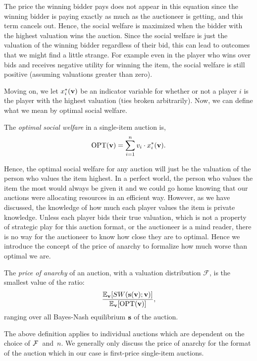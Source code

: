 \documentclass[12pt,twoside]{reedthesis}
\begin{document}
The price the winning bidder pays does not appear in this equation since the winning bidder is paying exactly as much as the auctioneer is getting, and this term cancels out. Hence, the social welfare is maximized when the bidder with the highest valuation wins the auction. Since the social welfare is just the valuation of the winning bidder regardless of their bid, this can lead to outcomes that we might find a little strange. For example even in the player who wins over bids and receives negative utility for winning the item, the social welfare is still positive (assuming valuations greater than zero). 

Moving on, we let $x^*_i(\textbf{v})$ be an indicator variable for whether or not a player $i$ is the player with the highest valuation (ties broken arbitrarily). Now, we can define what we mean by optimal social welfare. 

\begin{dfn}
	The {\em optimal social welfare} in a single-item auction is, 
	$$ \text{OPT}( \textbf{v}) = \sum_{i=1}^{n} v_i \cdot x^*_i (\textbf{v}).$$
\end{dfn}
Hence, the optimal social welfare for any auction will just be the valuation of the person who values the item highest. In a perfect world, the person who values the item the most would always be given it and we could go home knowing that our auctions were allocating resources in an efficient way. However, as we have discussed, the knowledge of how much each player values the item is private knowledge. Unless each player bids their true valuation, which is not a property of strategic play for this auction format, or the auctioneer is a mind reader, there is no way for the auctioneer to know how close they are to optimal. Hence we introduce the concept of the price of anarchy to formalize how much worse than optimal we are.
 
\begin{dfn}
	The \textit{price of anarchy} of an auction, with a valuation distribution $\mathcal{F}$, is the smallest value of the ratio:
	\begin{equation}
	\frac{\mathbb{E}_{\textbf{v}} [SW(\textbf{s}(\textbf{v});\textbf{v})]}{\mathbb{E}_{\textbf{v}}[\text{OPT}(\textbf{v})]},
	\label{eq:POA}
	\end{equation}
	ranging over all Bayes-Nash equilibrium $\textbf{s}$ of the auction.
\end{dfn}

The above definition applies to individual auctions which are dependent on the choice  of $\mathcal{F}$~and~$n$. We generally only discuss the price of anarchy for the format of the auction which in our case is first-price single-item auctions.
\end{document}
